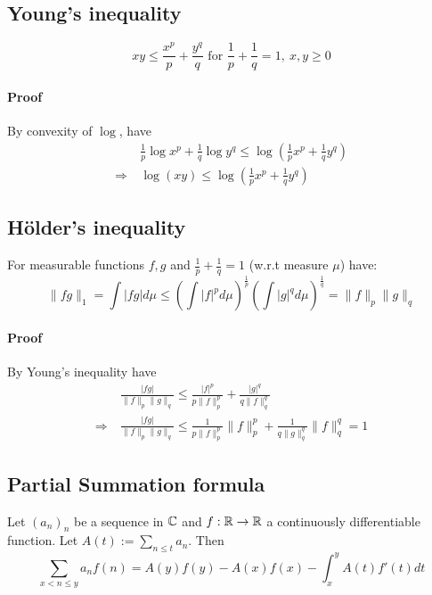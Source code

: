 
\subsection{Young's inequality}
\begin{equation}
    xy \leq \frac {x^p} p + \frac {y^q} q \text{ for } \frac 1 p + \frac 1 q = 1, \ x, y \geq 0 \nonumber
\end{equation}
\paragraph{Proof} By convexity of $\log$, have
\begin{equation}
    \begin{split}
        &\frac 1 p \log x^p + \frac 1 q \log y^q \leq \log \left( \frac 1 p x^p + \frac 1 q y^q \right) \\
        \Rightarrow \ &\log ( x y ) \leq \log \left( \frac 1 p x^p + \frac 1 q y^q \right) \nonumber
    \end{split}
\end{equation}

\subsection{Hölder's inequality} 
For measurable functions $f, g$ and $\frac 1 p + \frac 1 q = 1$ (w.r.t measure $\mu$) have:
\label{hoelder_inequality}
\begin{equation}
    \| fg \|_1 = \int | fg | d\mu \leq \left( \int |f|^p d\mu \right)^{\frac 1 p} \left( \int |g|^q d\mu \right)^{\frac 1 q} = \|f\|_p \|g\|_q \nonumber
\end{equation}
\paragraph{Proof} By Young's inequality have
\begin{equation}
    \begin{split}
        &\frac {|fg|} {\| f \|_p \| g \|_q} \leq \frac {|f|^p} {p\|f\|_p^p} + \frac {|g|^q} {q\|f\|_q^q} \\
        \Rightarrow \ &\frac {|fg|} {\| f \|_p \| g \|_q} \leq \frac 1 {p \|f\|_p^p} \|f\|_p^p + \frac 1 {q \|g\|_q^q} \|f\|_q^q = 1 \nonumber
    \end{split}
\end{equation}

\subsection{Partial Summation formula}
Let $(a_n)_n$ be a sequence in $\mathbb{C}$ and $f: \mathbb{R} \to \mathbb{R}$ a continuously differentiable function.
Let $A(t) := \sum_{n \leq t} a_n$. Then
\begin{equation*}
    \sum_{x < n \leq y} a_n f(n) = A(y)f(y) - A(x)f(x) - \int_x^y A(t)f'(t)dt
\end{equation*}
